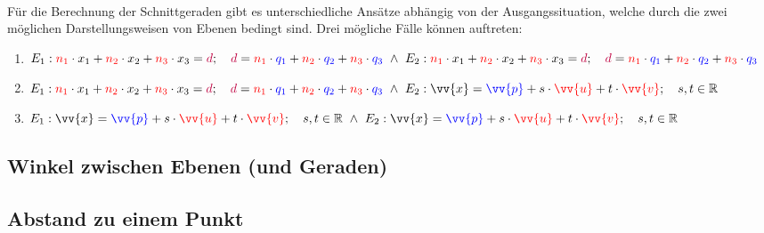         \paragraph{} Für die Berechnung der Schnittgeraden gibt es unterschiedliche Ansätze abhängig von der
        Ausgangssituation, welche durch die zwei möglichen Darstellungsweisen von Ebenen bedingt sind. Drei mögliche
        Fälle können auftreten:
        \begin{enumerate}[1)]
            \item $E_1:\textcolor{red}{n_1} \cdot x_1 + \textcolor{red}{n_2} \cdot x_2 + \textcolor{red}{n_3} \cdot x_3 = \textcolor{purple}{d} ; \quad \textcolor{purple}{d} = \textcolor{red}{n_1} \cdot \textcolor{blue}{q_1} + \textcolor{red}{n_2} \cdot \textcolor{blue}{q_2} + \textcolor{red}{n_3} \cdot \textcolor{blue}{q_3} \text{ } \land \text{ } E_2:\textcolor{red}{n_1} \cdot x_1 + \textcolor{red}{n_2} \cdot x_2 + \textcolor{red}{n_3} \cdot x_3 = \textcolor{purple}{d} ; \quad \textcolor{purple}{d} = \textcolor{red}{n_1} \cdot \textcolor{blue}{q_1} + \textcolor{red}{n_2} \cdot \textcolor{blue}{q_2} + \textcolor{red}{n_3} \cdot \textcolor{blue}{q_3}$
            \item $E_1:\textcolor{red}{n_1} \cdot x_1 + \textcolor{red}{n_2} \cdot x_2 + \textcolor{red}{n_3} \cdot x_3 = \textcolor{purple}{d} ; \quad \textcolor{purple}{d} = \textcolor{red}{n_1} \cdot \textcolor{blue}{q_1} + \textcolor{red}{n_2} \cdot \textcolor{blue}{q_2} + \textcolor{red}{n_3} \cdot \textcolor{blue}{q_3} \text{ } \land \text{ } E_2:\vv{x}=\textcolor{blue}{\vv{p}} + s\cdot \textcolor{red}{\vv{u}} + t\cdot \textcolor{red}{\vv{v}};\quad s,t\in\R$
            \item $E_1:\vv{x}=\textcolor{blue}{\vv{p}} + s\cdot \textcolor{red}{\vv{u}} + t\cdot \textcolor{red}{\vv{v}};\quad s,t\in\R \text{ } \land \text{ } E_2:\vv{x}=\textcolor{blue}{\vv{p}} + s\cdot \textcolor{red}{\vv{u}} + t\cdot \textcolor{red}{\vv{v}};\quad s,t\in\R$
        \end{enumerate}


    \subsection{Winkel zwischen Ebenen (und Geraden)}

    \subsection{Abstand zu einem Punkt}



